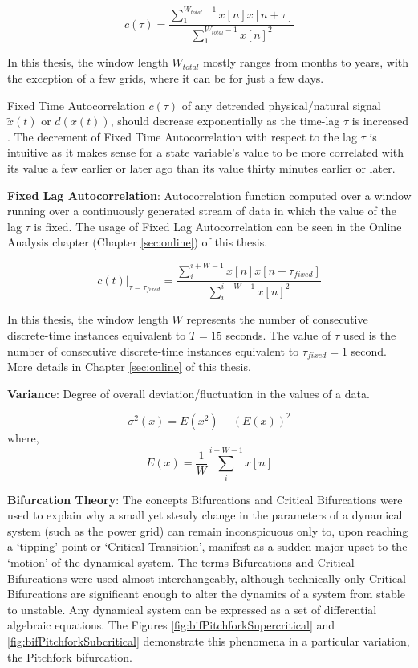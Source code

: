 \begin{equation}
	c(\tau) = \frac{\sum_{1}^{W_{total}-1} x[n]x[n+\tau]}{\sum_{1}^{W_{total}-1} x[n]^2} 
\end{equation}
 
In this thesis, the window length $W_{total}$ mostly ranges from months to years, with the exception of a few grids, where it can be for just a few days.
  
Fixed Time Autocorrelation $c(\tau)$ of any detrended physical/natural signal $\tilde{x}(t)$ or $d(x(t))$, should decrease exponentially as the time-lag $\tau$ is increased \cite{schafer01}. The decrement of Fixed Time Autocorrelation with respect to the lag $\tau$ is intuitive as it makes sense for a state variable's value to be more correlated with its value a few earlier or later ago than its value thirty minutes earlier or later.
 
 \textbf{Fixed Lag Autocorrelation}: Autocorrelation function computed over a window running over a continuously generated stream of data in which the value of the lag $\tau$ is fixed. The usage of Fixed Lag Autocorrelation can be seen in the Online Analysis chapter (Chapter \ref{sec:online}) of this thesis.
 
 \begin{equation}
 	c(t)|_{\tau = \tau_{fixed}} = \frac{\sum_{i}^{i+W-1} x[n]x[n+\tau_{fixed}]}{\sum_{i}^{i+W-1} x[n]^2} 
 \end{equation}
 
 In this thesis, the window length $W$ represents the number of consecutive discrete-time instances equivalent to $T=15$ seconds. The value of $\tau$ used is the number of consecutive discrete-time instances equivalent to $\tau_{fixed}=1$ second. More details in Chapter \ref{sec:online} of this thesis.

\textbf{Variance}: Degree of overall deviation/fluctuation in the values of a data.

\begin{equation}
	\sigma^2(x) = E(x^2) - (E(x))^2 
\end{equation}
\hspace{75pt} where,
\begin{equation}
	E(x) = \frac{1}{W} \sum_{i}^{i+W-1} x[n]
\end{equation}

\textbf{Bifurcation Theory}: The concepts Bifurcations and Critical Bifurcations were used to explain why a small yet steady change in the parameters of a dynamical system (such as the power grid) can remain inconspicuous only to, upon reaching a `tipping' point or `Critical Transition', manifest as a sudden major upset to the `motion' of the dynamical system. The terms Bifurcations and Critical Bifurcations were used almost interchangeably, although technically only Critical Bifurcations are significant enough to alter the dynamics of a system from stable to unstable. Any dynamical system can be expressed as a set of differential algebraic equations. The  Figures \ref{fig:bifPitchforkSupercritical} and \ref{fig:bifPitchforkSubcritical} demonstrate this phenomena in a particular variation, the Pitchfork bifurcation.


